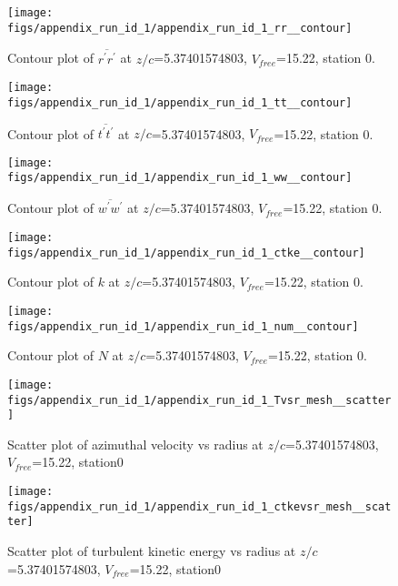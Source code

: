 \begin{figure}[H]
\centering
\texttt{[image: figs/appendix\_run\_id\_1/appendix\_run\_id\_1\_rr\_\_contour]}
\caption{Contour plot of $\overline{r^\prime r^\prime}$ at $z/c$=5.37401574803, $V_{free}$=15.22, station 0.}
\label{fig:appendix_run_id_1_rr__contour}
\end{figure}


\begin{figure}[H]
\centering
\texttt{[image: figs/appendix\_run\_id\_1/appendix\_run\_id\_1\_tt\_\_contour]}
\caption{Contour plot of $\overline{t^\prime t^\prime}$ at $z/c$=5.37401574803, $V_{free}$=15.22, station 0.}
\label{fig:appendix_run_id_1_tt__contour}
\end{figure}


\begin{figure}[H]
\centering
\texttt{[image: figs/appendix\_run\_id\_1/appendix\_run\_id\_1\_ww\_\_contour]}
\caption{Contour plot of $\overline{w^\prime w^\prime}$ at $z/c$=5.37401574803, $V_{free}$=15.22, station 0.}
\label{fig:appendix_run_id_1_ww__contour}
\end{figure}


\begin{figure}[H]
\centering
\texttt{[image: figs/appendix\_run\_id\_1/appendix\_run\_id\_1\_ctke\_\_contour]}
\caption{Contour plot of $k$ at $z/c$=5.37401574803, $V_{free}$=15.22, station 0.}
\label{fig:appendix_run_id_1_ctke__contour}
\end{figure}


\begin{figure}[H]
\centering
\texttt{[image: figs/appendix\_run\_id\_1/appendix\_run\_id\_1\_num\_\_contour]}
\caption{Contour plot of $N$ at $z/c$=5.37401574803, $V_{free}$=15.22, station 0.}
\label{fig:appendix_run_id_1_num__contour}
\end{figure}


\begin{figure}[H]
\centering
\texttt{[image: figs/appendix\_run\_id\_1/appendix\_run\_id\_1\_Tvsr\_mesh\_\_scatter]}
\caption{Scatter plot of azimuthal velocity vs radius at $z/c$=5.37401574803, $V_{free}$=15.22, station0}
\label{fig:appendix_run_id_1_Tvsr_mesh__scatter}
\end{figure}


\begin{figure}[H]
\centering
\texttt{[image: figs/appendix\_run\_id\_1/appendix\_run\_id\_1\_ctkevsr\_mesh\_\_scatter]}
\caption{Scatter plot of turbulent kinetic energy vs radius at $z/c$=5.37401574803, $V_{free}$=15.22, station0}
\label{fig:appendix_run_id_1_ctkevsr_mesh__scatter}
\end{figure}


